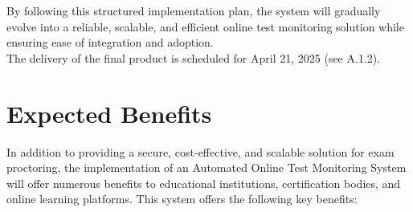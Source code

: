 \documentclass[12pt,a4paper]{article}
\begin{document}
By following this structured implementation plan, the system will gradually evolve into a reliable, scalable, and efficient online test monitoring solution while ensuring ease of integration and adoption.\\

The delivery of the final product is scheduled for April 21, 2025 (see A.1.2).



\section{Expected Benefits}

In addition to providing a secure, cost-effective, and scalable solution for exam proctoring, the implementation of an Automated Online Test Monitoring System will offer numerous benefits to educational institutions, certification bodies, and online learning platforms. This system offers the following key benefits:
\end{document}
